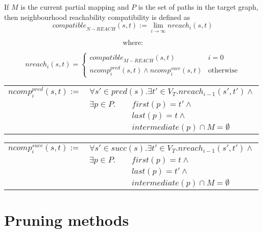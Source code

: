 \begin{minipage}{\textwidth}
\begin{defn}

If $M$ is the current partial mapping and $P$ is the set of paths in the target graph, then neighbourhood reachability compatibility is defined as $$\mathit{compatible}_{\mathit{N-REACH}}(s,t):= \lim_{i\to\infty} \mathit{nreach}_i(s, t) $$

$$\text{where:}$$

$$\mathit{nreach}_i(s, t) = \begin{cases}
                \mathit{compatible}_{\mathit{M-REACH}}(s,t)   & i = 0\\
               \mathit{ncomp}_i^{\mathit{pred}}(s, t) \land \mathit{ncomp}_i^{\mathit{succ}}(s, t) & \text{otherwise}
           \end{cases}$$

\vspace{10pt}

\begin{tabular}{lll}
\centering
$\mathit{ncomp}_i^{\mathit{pred}}(s, t) := $&\multicolumn{2}{l}{$\forall s' \in \mathit{pred}(s) . \exists t' \in V_T . \mathit{nreach}_{i-1}(s',t') \land $}\\
&$\exists p \in P .$  & $\mathit{first}(p)=t' \land$ \\
&&$\mathit{last}(p)=t \land$ \\
&&$\mathit{intermediate}(p) \cap M = \emptyset$
\end{tabular}

\begin{tabular}{lll}

$\mathit{ncomp}_i^{\mathit{succ}}(s, t) := $&\multicolumn{2}{l}{$\forall s' \in \mathit{succ}(s) . \exists t' \in V_T . \mathit{nreach}_{i-1}(s',t') \land $}\\
&$\exists p \in P .$  & $\mathit{first}(p)=t \land$ \\
&&$\mathit{last}(p)=t' \land$ \\
&&$\mathit{intermediate}(p) \cap M = \emptyset$
\end{tabular}

\end{defn}
\end{minipage}

\section{Pruning methods}
\label{sec:pruningmethods}
